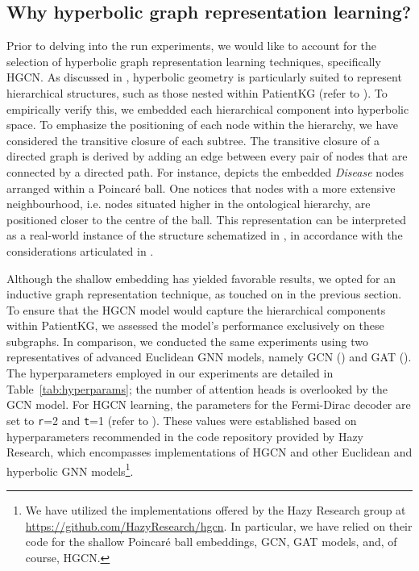 \subsection{Why hyperbolic graph representation learning?}\label{sec:hypPatientKG}
Prior to delving into the run experiments, we would like to account for the selection of hyperbolic graph representation learning techniques, specifically HGCN. As discussed in , hyperbolic geometry is particularly suited to represent hierarchical structures, such as those nested within PatientKG (refer to ). To empirically verify this, we embedded each hierarchical component into hyperbolic space. To emphasize the positioning of each node within the hierarchy, we have considered the transitive closure of each subtree. The transitive closure of a directed graph is derived by adding an edge between every pair of nodes that are connected by a directed path. For instance,  depicts the embedded \emph{Disease} nodes arranged within a Poincaré ball. One notices that nodes with a more extensive neighbourhood, i.e. nodes situated higher in the ontological hierarchy, are positioned closer to the centre of the ball. This representation can be interpreted as a real-world instance of the structure schematized in , in accordance with the considerations articulated in . 


Although the shallow embedding has yielded favorable results, we opted for an inductive graph representation technique, as touched on in the previous section. To ensure that the HGCN model would capture the hierarchical components within PatientKG, we assessed the model's performance exclusively on these subgraphs. In comparison, we conducted the same experiments using two representatives of advanced Euclidean GNN models, namely GCN () and GAT (). The hyperparameters employed in our experiments are detailed in Table~\ref{tab:hyperparams}; the number of attention heads is overlooked by the GCN model. For HGCN learning, the parameters for the Fermi-Dirac decoder are set to \texttt{r}=2 and \texttt{t}=1 (refer to ). These values were established based on hyperparameters recommended in the code repository provided by Hazy Research, which encompasses implementations of HGCN and other Euclidean and hyperbolic GNN models\footnote{We have utilized the implementations offered by the Hazy Research group at \url{https://github.com/HazyResearch/hgcn}. In particular, we have relied on their code for the shallow Poincaré ball embeddings, GCN, GAT models, and, of course, HGCN.}. 



